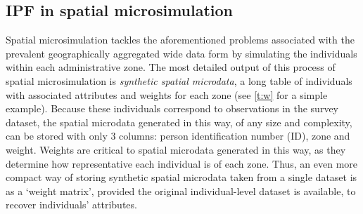 \documentclass[a4paper,10pt]{article}
\begin{document}

\subsection{IPF in spatial microsimulation}
Spatial microsimulation tackles the aforementioned problems associated
with the prevalent geographically aggregated wide data form by simulating
the individuals within each administrative zone. The most detailed output of this process of 
spatial microsimulation is \emph{synthetic spatial microdata}, a long table of individuals with 
associated attributes and weights for each zone (see \cref{t:w} %
 for a simple example). 
Because these individuals correspond to observations in the survey dataset,
the spatial microdata generated in this way, of any size and complexity,
can be stored with only 3 columns: person identification number (ID), 
zone and weight. Weights are critical to spatial microdata generated in this way, as they 
determine how representative each individual is of each zone. Thus, an even more compact way 
of storing synthetic spatial microdata taken from a single dataset is as a `weight matrix',
provided the original individual-level dataset is available, to recover individuals'
attributes.
\end{document}
